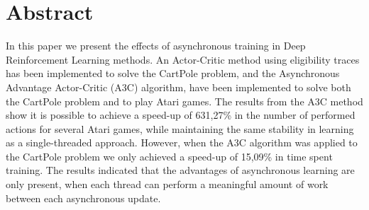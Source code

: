 \documentclass[11pt]{article}
\begin{document}
\section*{Abstract}

In this paper we present the effects of asynchronous training in
Deep Reinforcement Learning methods.
An Actor-Critic method using eligibility traces has been implemented to solve the CartPole problem,
and the Asynchronous Advantage
Actor-Critic (A3C) algorithm,
have been implemented to solve both the CartPole problem and to play Atari games.
The results from the A3C method show it is possible to achieve a speed-up of 631,27\% in
the number of performed actions for several Atari games,
while maintaining the same stability in learning as a single-threaded approach.
However, when the A3C algorithm was applied to the CartPole problem
we only achieved a speed-up of 15,09\% in time spent training.
The results indicated that the advantages of asynchronous learning are only present,
when each thread can perform a meaningful amount of work between
each asynchronous update.
\end{document}

